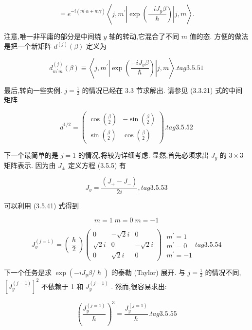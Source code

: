 $$
= {e}^{-i\left( {{m}^{\prime }\alpha + {m\gamma }}\right) }\left\langle {j,{m}^{\prime }\left| {\exp \left( \frac{-i{J}_{y}\beta }{\hslash }\right) }\right| j, m}\right\rangle .
$$

注意,唯一非平庸的部分是中间绕 $y$ 轴的转动,它混合了不同 $m$ 值的态. 方便的做法是把一个新矩阵 ${d}^{\left( j\right) }\left( \beta \right)$ 定义为

$$
{d}_{{m}^{\prime }m}^{\left( j\right) }\left( \beta \right) \equiv \left\langle {j,{m}^{\prime }\left| {\exp \left( \frac{-i{J}_{y}\beta }{\hslash }\right) }\right| j, m}\right\rangle . tag{3. 5.51}
$$

最后,转向一些实例. $j = \frac{1}{2}$ 的情况已经在 3.3 节求解出. 请参见 (3.3.21) 式的中间矩阵

$$
{d}^{1/2} = \left( \begin{matrix} \cos \left( \frac{\beta }{2}\right) & - \sin \left( \frac{\beta }{2}\right) \\ \sin \left( \frac{\beta }{2}\right) & \cos \left( \frac{\beta }{2}\right) \end{matrix}\right) . tag{3. 5.52}
$$

下一个最简单的是 $j = 1$ 的情况,将较为详细考虑. 显然,首先必须求出 ${J}_{y}$ 的 $3 \times 3$ 矩阵表示. 因为由 ${J}_{ \pm }$ 定义方程 (3.5.5) 有

$$
{J}_{y} = \frac{\left( {J}_{ + } - {J}_{ - }\right) }{2i}, tag{3. 5.53}
$$

可以利用 (3.5.41) 式得到

$$
m = 1\;m = 0\;m = - 1
$$

$$
{J}_{y}^{\left( j = 1\right) } = \left( \frac{\hslash }{2}\right) \left( \begin{matrix} 0 & - \sqrt{2}i & 0 \\ \sqrt{2}i & 0 & - \sqrt{2}i \\ 0 & \sqrt{2}i & 0 \end{matrix}\right) \;\begin{array}{l} {m}^{\prime } = 1 \\ {m}^{\prime } = 0 \\ {m}^{\prime } = - 1 \end{array} tag{3. 5.54}
$$

下一个任务是求 $\exp \left( {-i{J}_{y}\beta /\hslash }\right)$ 的泰勒 (Taylor) 展开. 与 $j = \frac{1}{2}$ 的情况不同, ${\left\lbrack {J}_{y}^{\left( j = 1\right) }\right\rbrack }^{2}$ 不依赖于 1 和 ${J}_{y}^{\left( j = 1\right) }$ . 然而,很容易求出:

$$
{\left( \frac{{J}_{y}^{\left( j = 1\right) }}{\hslash }\right) }^{3} = \frac{{J}_{y}^{\left( j = 1\right) }}{\hslash }. tag{3. 5.55}
$$

